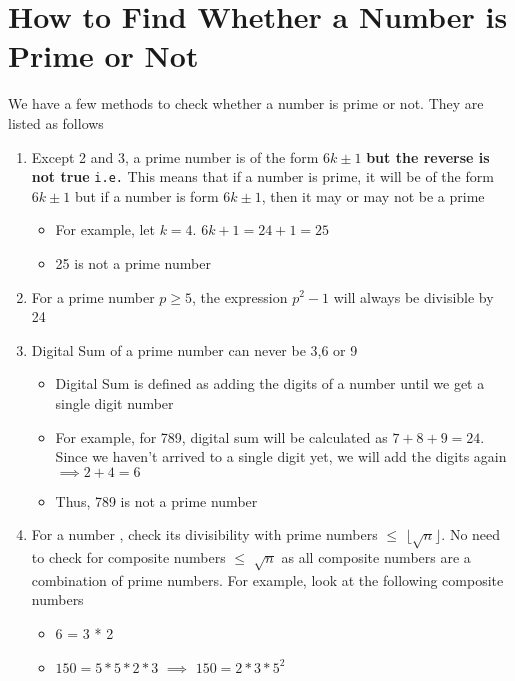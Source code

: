 
\section{How to Find Whether a Number is Prime or Not}
We have a few methods to check whether a number is prime or not. They are listed as follows
\begin{enumerate}
    \item Except 2 and 3, a prime number is of the form $6k \pm 1$ \textbf{but the reverse is not true} \texttt{i.e.} This means that if a number is prime, it will be of the form $6k \pm 1$ but if a number is form $6k \pm 1$, then it may or may not be a prime
    \begin{itemize}
        \item For example, let $k=4$. $6k + 1 = 24 + 1 = 25$
        \item 25 is not a prime number
    \end{itemize}

    \item For a prime number $p \geq 5$, the expression $p^2 - 1$ will always be divisible by 24 \label{th_p_sq_24}

    \item Digital Sum of a prime number can never be 3,6 or 9
    \begin{itemize}
        \item Digital Sum is defined as adding the digits of a number until we get a single digit number
        \item For example, for 789, digital sum will be calculated as $7 + 8 + 9 = 24$. Since we haven't arrived to a single digit yet, we will add the digits again $\implies 2 + 4 = 6$
        \item Thus, 789 is not a prime number
    \end{itemize}
    
    \item For a number , check its divisibility with prime numbers $\leq$ $\lfloor \sqrt{n} \rfloor$. No need to check for composite numbers $\leq$ $\sqrt{n}$ as all composite numbers are a combination of prime numbers. For example, look at the following composite numbers
    \begin{itemize}
        \item 6 = 3 * 2
        \item $150 = 5 * 5 * 2 * 3$ $\implies$ $150 = 2 * 3 * 5^2$
    \end{itemize}
\end{enumerate}


